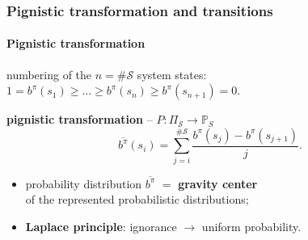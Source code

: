 \documentclass[12pt,svgnames,table]{beamer}
\begin{document}
\begin{frame}
\frametitle{Pignistic transformation and transitions}
\framesubtitle{\footnotesize Pignistic transformation}
numbering of the $n = \# \mathcal{S}$ system states:
$1 = b^{\pi}(s_1) \geqslant \ldots \geqslant b^{\pi}(s_{n}) \geqslant b^{\pi}(s_{n+1}) = 0$.
\begin{exampleblock}{\textbf{pignistic transformation} -- $P: \Pi_{\mathcal{S}} \rightarrow \mathbb{P}_{S} $}
\[ \overline{b^{\pi}}(s_i) = \sum_{j=i}^{\# \mathcal{S}} \frac{b^{\pi}(s_j) - b^{\pi}(s_{j+1})}{j}.\]
\end{exampleblock}
\begin{itemize}
\item probability distribution $\overline{b^{\pi}}$ $=$ \textbf{gravity center} \\ 
\hspace{1cm} of the represented probabilistic distributions;
\item \textbf{Laplace principle}: ignorance $\rightarrow$ uniform probability.
\end{itemize}
\end{frame}
\end{document}
